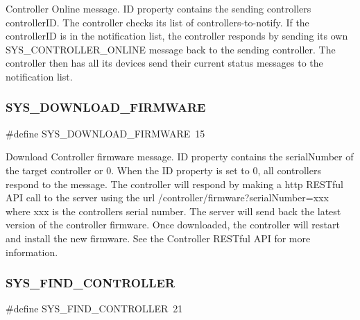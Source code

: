Controller Online message. ID property contains the sending controller\textquotesingle{}s controller\+ID. The controller checks its list of controllers-\/to-\/notify. If the controller\+ID is in the notification list, the controller responds by sending its own S\+Y\+S\+\_\+\+C\+O\+N\+T\+R\+O\+L\+L\+E\+R\+\_\+\+O\+N\+L\+I\+NE message back to the sending controller. The controller then has all its devices send their current status messages to the notification list. \mbox{\label{group___u_d_p_message_i_d_ga88b6f619a28320e9136847e9b1b27a36}} 
\subsubsection{\texorpdfstring{S\+Y\+S\+\_\+\+D\+O\+W\+N\+L\+O\+A\+D\+\_\+\+F\+I\+R\+M\+W\+A\+RE}{SYS\_DOWNLOAD\_FIRMWARE}}
{\footnotesize\ttfamily \#define S\+Y\+S\+\_\+\+D\+O\+W\+N\+L\+O\+A\+D\+\_\+\+F\+I\+R\+M\+W\+A\+RE~15}

Download Controller firmware message. ID property contains the serial\+Number of the target controller or 0. When the ID property is set to 0, all controllers respond to the message. The controller will respond by making a http R\+E\+S\+Tful A\+PI call to the server using the url /controller/firmware?serial\+Number=xxx where xxx is the controller\textquotesingle{}s serial number. The server will send back the latest version of the controller firmware. Once downloaded, the controller will restart and install the new firmware. See the Controller R\+E\+S\+Tful A\+PI for more information. \mbox{\label{group___u_d_p_message_i_d_gadfda0e5a5a6a08de555dd55182a4cd87}} 
\subsubsection{\texorpdfstring{S\+Y\+S\+\_\+\+F\+I\+N\+D\+\_\+\+C\+O\+N\+T\+R\+O\+L\+L\+ER}{SYS\_FIND\_CONTROLLER}}
{\footnotesize\ttfamily \#define S\+Y\+S\+\_\+\+F\+I\+N\+D\+\_\+\+C\+O\+N\+T\+R\+O\+L\+L\+ER~21}

